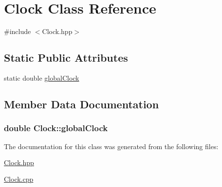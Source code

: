 \hypertarget{class_clock}{\section{Clock Class Reference}
\label{class_clock}
}


{\ttfamily \#include $<$Clock.\-hpp$>$}

\subsection*{Static Public Attributes}
\begin{DoxyCompactItemize}
\item 
static double \hyperlink{class_clock_a9ae2a018e36b6485f9be0117c381f523}{global\-Clock}
\end{DoxyCompactItemize}


\subsection{Member Data Documentation}
\hypertarget{class_clock_a9ae2a018e36b6485f9be0117c381f523}{
\subsubsection[{global\-Clock}]{\setlength{\rightskip}{0pt plus 5cm}double Clock\-::global\-Clock\hspace{0.3cm}{\ttfamily [static]}}}\label{class_clock_a9ae2a018e36b6485f9be0117c381f523}


The documentation for this class was generated from the following files\-:\begin{DoxyCompactItemize}
\item 
\hyperlink{_clock_8hpp}{Clock.\-hpp}\item 
\hyperlink{_clock_8cpp}{Clock.\-cpp}\end{DoxyCompactItemize}
